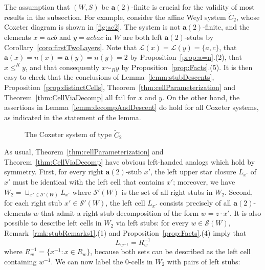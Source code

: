 \documentclass[ALCO,Unicode,published]{cedram}
\newcommand{\call}{\mathcal{L}}
\newcommand{\cals}{\mathcal{S}}
\newcommand{\la}{\mathbf{a}}
\newcommand{\sw}{\mathcal{S}(W)}
\newcommand{\inverse}{^{-1}}
\begin{document}
\begin{remark}
    \label{rmk:a2finiteAssumption}
    The assumption that $(W,S)$ be $\la(2)$-finite is crucial for the validity of most results in
    the subsection.  For example, consider the affine Weyl system $\tilde C_2$, whose Coxeter
    diagram is shown in \autoref{fig:ac2}.  The system is not $\la(2)$-finite, and the elements
    $x=acb$ and $y=acbac$ in $W$ are both left $\la(2)$-stubs by Corollary~\ref{coro:firstTwoLayers}. Note
    that $\call(x)=\call(y)=\{a,c\}$, that $\la(x)=n(x)=\la(y)=n(y)=2$ by Proposition~\ref{prop:a=n}.(2), that
    $x\le^R y$, and that consequently $x\sim_{R}y $ by Proposition~\ref{prop:Facts}.(5). It is then easy to
    check that the conclusions of Lemma~\ref{lemm:stubDescents}, Proposition~\ref{prop:distinctCells},
    Theorem~\ref{thm:cellParameterization} and Theorem~\ref{thm:CellViaDecomp} all fail for $x$ and $y$. On the
    other hand, the assertions in Lemma~\ref{lemm:decompAndDescent} do hold for all Coxeter systems, as
    indicated in the statement of the lemma. 

    \begin{figure} \begin{center} 
        \end{center}
        \caption{The Coxeter system of type $\tilde C_2$}
        \label{fig:ac2}
    \end{figure}
\end{remark}

As usual, Theorem~\ref{thm:cellParameterization} and Theorem~\ref{thm:CellViaDecomp} have obvious left-handed
analogs which hold by symmetry.  First, for every right $\la(2)$-stub $x'$, the left upper star
closure $L_{x'}$ of $x'$ must be identical with the left cell that contains $x'$; moreover, we have
$W_2=\sqcup_{x'\in\cals'(W)}L_{x'}$ where $\cals'(W)$ is the set of all right stubs in $W_2$.
Second, for each right stub $x'\in \cals'(W)$, the left cell $L_{x'}$ consists precisely of all
$\la(2)$-elements $w$ that admit a right stub decomposition of the form $w=z\cdot x'$.  It is also
possible to describe left cells in $W_2$ via left stubs: for every $w\in \sw$,
Remark~\ref{rmk:stubRemarks1}.(1) and Proposition~\ref{prop:Facts}.(4) imply that
\begin{equation}
    \label{eq:1cellSymmetry} L_{w\inverse}=R_w\inverse
\end{equation} where $R_w\inverse=\{x\inverse: x\in R_w\}$, because both sets can be described as
    the left cell containing $w\inverse$. We can now label the 0-cells in $W_2$ with pairs of left
    stubs: 
\end{document}
